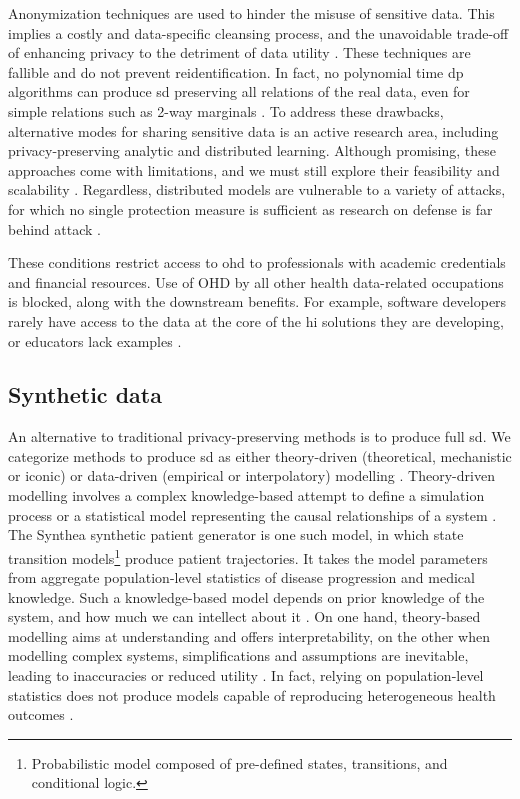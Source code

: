         Anonymization techniques are used to hinder the misuse of sensitive data. This implies a costly and data-specific cleansing process, and the unavoidable trade-off of enhancing privacy to the detriment of data utility \cite{Dankar2012-bd, Cheu2019-vh, De_Cristofaro2020-tl}. These techniques are fallible and do not prevent reidentification. In fact, no polynomial time \gls{dp} algorithms can produce \gls{sd} preserving all relations of the real data, even for simple relations such as 2-way marginals \cite{Ullman2011}. To address these drawbacks, alternative modes for sharing sensitive data is an active research area, including privacy-preserving analytic and distributed learning. Although promising, these approaches come with limitations, and we must still explore their feasibility and scalability \cite{Raisaro2018-gv}. Regardless, distributed models are vulnerable to a variety of attacks, for which no single protection measure is sufficient as research on defense is far behind attack \cite{enthoven2020overview, Gao2020, Luo2020-gq, Lyu2020-sv}.\par
        These conditions restrict access to \gls{ohd} to professionals with academic credentials and financial resources. Use of OHD by all other health data-related occupations is blocked, along with the downstream benefits. For example, software developers rarely have access to the data at the core of the \gls{hi} solutions they are developing, or educators lack examples \cite{laderas_teaching_2018}.
        
    \subsection{Synthetic data}
        An alternative to traditional privacy-preserving methods is to produce full \gls{sd}. We categorize methods to produce \gls{sd} as either theory-driven (theoretical, mechanistic or iconic) or data-driven (empirical or interpolatory) modelling \cite{Kim_2017, Hand2019}. Theory-driven modelling involves a complex knowledge-based attempt to define a simulation process or a statistical model representing the causal relationships of a system \cite{Yousefi2018-dy, Kansal2018-dx}. The Synthea \cite{Walonoski_2017} synthetic patient generator is one such model, in which state transition models\footnote{Probabilistic model composed of pre-defined states, transitions, and conditional logic.} produce patient trajectories. It takes the model parameters from aggregate population-level statistics of disease progression and medical knowledge. Such a knowledge-based model depends on prior knowledge of the system, and how much we can intellect about it \cite{Kim_2017, Bonnery2019-ug}. On one hand, theory-based modelling aims at understanding and offers interpretability, on the other when modelling complex systems, simplifications and assumptions are inevitable, leading to inaccuracies or reduced utility \cite{Hand2019, Rankin2020}. In fact, relying on population-level statistics does not produce models capable of reproducing heterogeneous health outcomes \cite{Chen_2019}.\par
        
